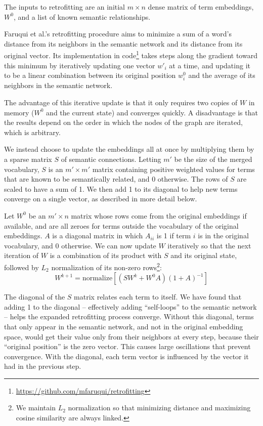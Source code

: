 \documentclass[11pt,letterpaper]{article}
\begin{document}
The inputs to retrofitting are an initial $m \times n$ dense matrix of term
embeddings, $W^0$, and a list of known semantic relationships.

Faruqui et al.'s retrofitting procedure aims to minimize a sum of
a word's distance from its neighbors in the semantic network and its distance
from its original vector. Its implementation in code\footnote{
    \url{https://github.com/mfaruqui/retrofitting}
} takes steps along the gradient toward this minimum
by iteratively updating one vector $w'_i$ at a time, and updating it to be a linear
combination between its original position $w^0_i$ and the average of its neighbors
in the semantic network.

The advantage of this iterative update is that it only requires two copies of
$W$ in memory ($W^0$ and the current state) and converges quickly. A disadvantage
is that the results depend on the order in which the nodes of the graph are
iterated, which is arbitrary.

We instead choose to update the embeddings all at once by multiplying them by a
sparse matrix $S$ of semantic connections. Letting $m'$ be the size of the
merged vocabulary, $S$ is an $m' \times m'$ matrix containing positive weighted
values for terms that are known to be semantically related, and 0 otherwise.
The rows of $S$ are scaled to have a sum of 1. We then add 1 to its diagonal to
help new terms converge on a single vector, as described in more detail below.

Let $W^0$ be an $m' \times n$ matrix whose rows come from the original
embeddings if available, and are all zeroes for terms outside the vocabulary of
the original embeddings. $A$ is a diagonal matrix in which $A_{ii}$ is 1 if term
$i$ is in the original vocabulary, and 0 otherwise. We can now update $W$
iteratively so that the next iteration of $W$ is a combination of its product
with $S$ and its original state, followed by $L_2$ normalization of its
non-zero rows\footnote{
    We maintain $L_2$ normalization so that minimizing distance and maximizing
    cosine similarity are always linked.
}:
$$
W^{k+1} = \mathrm{normalize}\left[ \left( S W^k + W^0 A \right)\left( 1 + A \right)^{-1} \right]
$$

The diagonal of the $S$ matrix relates each term to itself. We have found that
adding 1 to the diagonal -- effectively adding ``self-loops'' to the semantic
network -- helps the expanded retrofitting process converge.  Without this
diagonal, terms that only appear in the semantic network, and not in the
original embedding space, would get their value only from their neighbors at
every step, because their ``original position'' is the zero vector. This causes
large oscillations that prevent convergence.  With the diagonal, each term
vector is influenced by the vector it had in the previous step.
\end{document}

